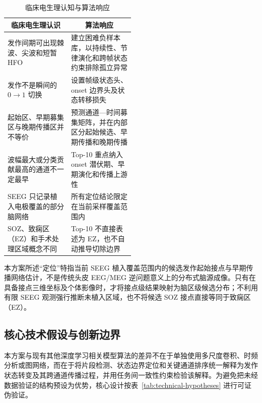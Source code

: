 \documentclass{cumcmthesis_v2}
\numberwithin{figure}{section} %
\numberwithin{table}{section} %
\begin{document}
\begin{table}[htbp]
    \centering
    \caption{临床电生理认知与算法响应}
    \label{tab:clinical-response}

    \renewcommand{\arraystretch}{1.5}
    \setlength{\tabcolsep}{5pt}

    \begin{tabularx}{\linewidth}{@{}
        p{0.50\linewidth}
        X
    @{}}
        \toprule[1pt]
        \multicolumn{1}{c}{\textbf{临床电生理认识}} &
        \multicolumn{1}{c}{\textbf{算法响应}} \\
        \midrule

        发作间期可出现棘波、尖波和短暂 HFO	 &建立困难负样本库，以持续性、节律演化和跨帧状态约束排除孤立异常 \\
        发作不是瞬间的 $0\rightarrow1$ 切换	 &设置帧级状态头、onset 边界头及状态转移损失 \\
        起始区、早期募集区与晚期传播区并不等价 &	预测通道—时间募集矩阵，并在内部区分起始候选、早期传播和晚期传播 \\
        波幅最大或分类贡献最高的通道不一定最早	 &Top-10 重点纳入 onset 潜伏期、早期演化和传播上游性 \\
        SEEG 只记录植入电极覆盖的部分脑网络	 &所有定位结论限定在当前采样覆盖范围内 \\
        SOZ、致痫区（EZ）和手术处理区域概念不同 &	Top-10 不直接表述为 EZ，也不自动推导切除边界\\
        \bottomrule[1pt]

    \end{tabularx}
\end{table}


本方案所述“定位”特指当前 SEEG 植入覆盖范围内的候选发作起始接点与早期传播网络估计，不是传统头皮 EEG/MEG 逆问题意义上的分布式脑源成像。只有在具备接点三维坐标及个体影像时，才将接点级结果映射为脑区级候选分布；不利用有限 SEEG 观测强行推断未植入区域，也不将候选 SOZ 接点直接等同于致痫区（EZ）。


\subsection{核心技术假设与创新边界}
本方案与现有其他深度学习相关模型算法的差异不在于单独使用多尺度卷积、时频分析或图网络，而在于将片段检测、状态边界定位和关键通道排序统一解释为发作状态转变及其跨通道传播过程，并用任务间一致性约束检验该解释。为避免把未经数据验证的结构预设为优势，核心设计按表~\ref{tab:technical-hypotheses} 进行可证伪验证。
\end{document}

